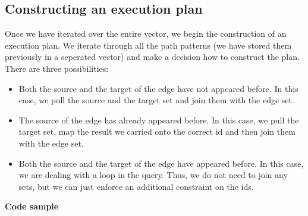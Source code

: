 \documentclass[11pt,singlecolumn]{scrartcl}
\begin{document}
\subsection{Constructing an execution plan}
Once we have iterated over the entire vector, we begin the construction of an execution plan. We iterate through all the path patterns (we have stored them previously in a seperated vector) and make a decision how to construct the plan. There are three possibilities:
\begin{itemize}
\item Both the source and the target of the edge have not appeared before. In this case, we pull the source and the target set and join them with the edge set. 
\item The source of the edge has already appeared before. In this case, we pull the target set, map the result we carried onto the correct id and then join them with the edge set.
\item Both the source and the target of the edge have appeared before. In this case, we are dealing with a loop in the query. Thus, we do not need to join any sets, but we can just enforce an additional constraint on the ids.
\end{itemize}
\textbf{Code sample}
\end{document}

